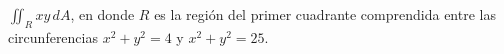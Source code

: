 \item $\iint_R xy \, dA$, en donde $R$ es la región del primer cuadrante comprendida entre las circunferencias $x^2 + y^2 = 4$ y $x^2 + y^2 = 25$.
